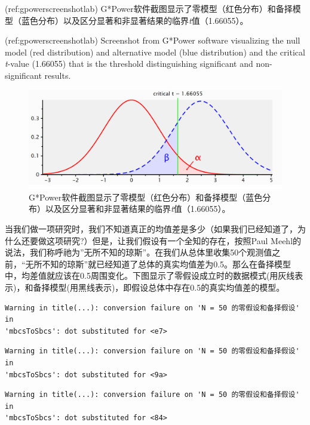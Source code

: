 \documentclass[
  letterpaper,
  DIV=11,
  numbers=noendperiod]{scrreprt}
\begin{document}
(ref:gpowerscreenshotlab)
G*Power软件截图显示了零模型（红色分布）和备择模型（蓝色分布）以及区分显著和非显著结果的临界\emph{t}值（1.66055）。

(ref:gpowerscreenshotlab) Screenshot from G*Power software visualizing
the null model (red distribution) and alternative model (blue
distribution) and the critical \emph{t}-value (1.66055) that is the
threshold distinguishing significant and non-significant results.

\begin{figure}

{\centering \includegraphics[width=1\textwidth,height=\textheight]{images/1.3.3.png}

}

\caption{\label{fig-gpowerscreenshot}G*Power软件截图显示了零模型（红色分布）和备择模型（蓝色分布）以及区分显著和非显著结果的临界\emph{t}值（1.66055）。}

\end{figure}

当我们做一项研究时，我们不知道真正的均值差是多少（如果我们已经知道了，为什么还要做这项研究?）但是，让我们假设有一个全知的存在，按照Paul
Meehl的说法，我们称呼祂为''无所不知的琼斯''。在我们从总体里收集50个观测值之前，``无所不知的琼斯''就已经知道了总体的真实均值差为0.5。那么在备择模型中，均差值就应该在0.5周围变化。下图显示了零假设成立时的数据模式(用灰线表示)，和备择模型(用黑线表示)，即假设总体中存在0.5的真实均值差的模型。

\begin{verbatim}
Warning in title(...): conversion failure on 'N = 50 的零假设和备择假设' in
'mbcsToSbcs': dot substituted for <e7>
\end{verbatim}

\begin{verbatim}
Warning in title(...): conversion failure on 'N = 50 的零假设和备择假设' in
'mbcsToSbcs': dot substituted for <9a>
\end{verbatim}

\begin{verbatim}
Warning in title(...): conversion failure on 'N = 50 的零假设和备择假设' in
'mbcsToSbcs': dot substituted for <84>
\end{verbatim}
\end{document}
